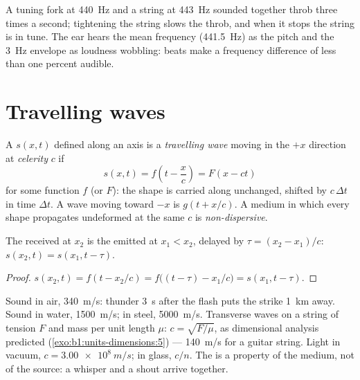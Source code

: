 \begin{example}\label{ex:b1:wave-propagation:tuning}
A tuning fork at \qty{440}{Hz} and a string at \qty{443}{Hz} sounded
together throb three times a second; tightening the string slows the
throb, and when it stops the string is in tune. The ear hears the mean
frequency (\qty{441.5}{Hz}) as the pitch and the \qty{3}{Hz} envelope as
loudness wobbling: beats make a frequency difference of less than one
percent audible.
\end{example}

\section{Travelling waves}

\begin{definition}\label{def:b1:wave-propagation:travelling}
A  $s(x, t)$ defined along an axis is a \emph{travelling wave}
moving in the $+x$ direction at \emph{celerity} $c$ if
\[
s(x, t) = f\!\left(t - \frac{x}{c}\right) = F(x - ct)
\]
for some function $f$ (or $F$): the shape is carried along unchanged,
shifted by $c\,\Delta t$ in time $\Delta t$. A wave moving toward $-x$ is
$g(t + x/c)$. A medium in which every shape propagates undeformed at
the same $c$ is \emph{non-dispersive}.
\end{definition}

\begin{proposition}[Delay]\label{prop:b1:wave-propagation:delay}
The  received at $x_2$ is the  emitted at $x_1 < x_2$,
delayed by $\tau = (x_2 - x_1)/c$: $s(x_2, t) = s(x_1, t - \tau)$.
\end{proposition}

\begin{proof}
$s(x_2, t) = f(t - x_2/c) = f\big((t - \tau) - x_1/c\big) = s(x_1, t - \tau)$.
\end{proof}

\begin{example}[Celerities]\label{ex:b1:wave-propagation:celerities}
Sound in air, \qty{340}{m/s}: thunder \qty{3}{s} after the flash puts
the strike \qty{1}{km} away. Sound in water, \qty{1500}{m/s}; in steel,
\qty{5000}{m/s}. Transverse waves on a string of tension $F$ and mass
per unit length $\mu$: $c = \sqrt{F/\mu}$, as dimensional analysis
predicted (\cref{exo:b1:units-dimensions:5}) --- \qty{140}{m/s} for a
guitar string. Light in vacuum, $c = \qty{3.00e8}{m/s}$; in glass,
$c/n$. The  is a property of the medium, not of the source: a
whisper and a shout arrive together.
\end{example}

